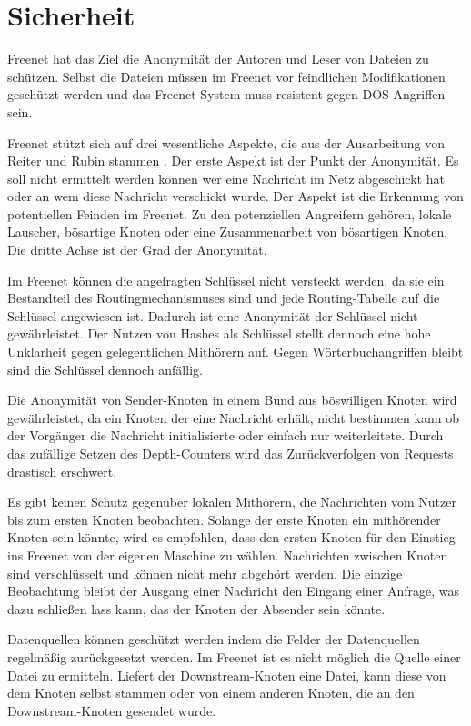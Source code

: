 \section{Sicherheit}
Freenet hat das Ziel die Anonymität der Autoren und Leser von Dateien zu
schützen. Selbst die Dateien müssen im Freenet vor feindlichen Modifikationen
geschützt werden und das Freenet-System muss resistent gegen DOS-Angriffen
sein.

Freenet stützt sich auf drei wesentliche Aspekte, die aus der Ausarbeitung
von Reiter und Rubin stammen \cite{reiterandrubin}. Der erste Aspekt ist der
Punkt der Anonymität. Es soll nicht ermittelt werden können wer eine Nachricht
im Netz abgeschickt hat oder an wem diese Nachricht verschickt wurde.
Der Aspekt ist die Erkennung von potentiellen Feinden im Freenet. Zu den
potenziellen Angreifern gehören, lokale Lauscher, bösartige Knoten oder eine
Zusammenarbeit von bösartigen Knoten. Die dritte Achse ist der Grad der
Anonymität.

Im Freenet können die angefragten Schlüssel nicht versteckt werden, da
sie ein Bestandteil des Routingmechanismuses sind und jede Routing-Tabelle auf
die Schlüssel angewiesen ist. Dadurch ist eine Anonymität der Schlüssel nicht
gewährleistet. Der Nutzen von Hashes als Schlüssel stellt dennoch eine hohe
Unklarheit gegen gelegentlichen Mithörern auf.
Gegen Wörterbuchangriffen bleibt sind die Schlüssel dennoch anfällig.

Die Anonymität von Sender-Knoten in einem Bund aus böswilligen Knoten wird
gewährleistet, da ein Knoten der eine Nachricht erhält, nicht bestimmen kann
ob der Vorgänger die Nachricht initialisierte oder einfach nur
weiterleitete. Durch das zufällige Setzen des Depth-Counters wird das
Zurückverfolgen von Requests drastisch erschwert.

Es gibt keinen Schutz gegenüber lokalen Mithörern, die Nachrichten vom Nutzer
bis zum ersten Knoten beobachten. Solange der erste Knoten ein mithörender
Knoten sein könnte, wird es empfohlen, dass den ersten Knoten für
den Einstieg ins Freenet von der eigenen Maschine zu wählen. Nachrichten
zwischen Knoten sind verschlüsselt und können nicht mehr abgehört werden. Die
einzige Beobachtung bleibt der Ausgang einer Nachricht den Eingang einer
Anfrage, was dazu schließen lass kann, das der Knoten der Absender sein könnte.

Datenquellen können geschützt werden indem die Felder der Datenquellen
regelmäßig zurückgesetzt werden.
Im Freenet ist es nicht möglich die Quelle einer Datei zu ermitteln. Liefert
der Downstream-Knoten eine Datei, kann diese von dem Knoten selbst stammen oder
von einem anderen Knoten, die an den Downstream-Knoten gesendet wurde.

